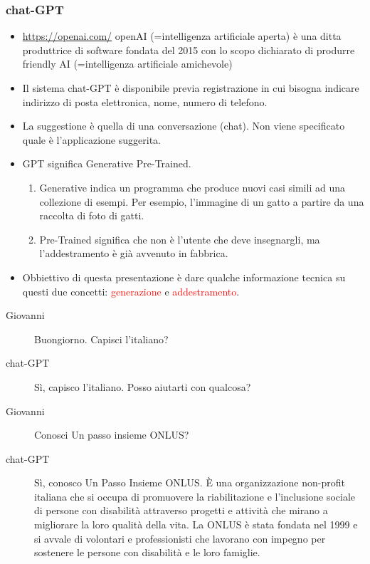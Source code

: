 \documentclass[xcolor=svgnames]{beamer}
\newcommand{\rosso}[1]{\textcolor{red}{#1}}
\renewcommand{\emph}{\rosso}
\begin{document}
\begin{frame}\small\frametitle{chat-GPT}

\begin{itemize}
\item \url{https://openai.com/} openAI (=intelligenza artificiale aperta) è una ditta produttrice di software fondata del 2015 con lo scopo dichiarato di produrre friendly 
AI (=intelligenza artificiale amichevole)
    \item Il sistema chat-GPT è disponibile previa registrazione in cui bisogna indicare indirizzo di posta elettronica, nome, numero di telefono.
    \item La suggestione è quella di una conversazione (chat). Non viene specificato quale è l'applicazione suggerita.
    \item GPT significa Generative Pre-Trained. 
    \begin{enumerate}
        \item Generative indica un programma che produce nuovi casi simili ad una collezione di esempi. Per esempio, l'immagine di un gatto a partire da una raccolta di foto di gatti.
        \item Pre-Trained significa che non è l'utente che deve insegnargli, ma l'addestramento è già avvenuto in fabbrica.
    \end{enumerate} 
    \item Obbiettivo di questa presentazione è dare qualche informazione tecnica su questi due concetti: \emph{generazione} e \emph{addestramento}.
\end{itemize}

\begin{description}

\item[Giovanni] Buongiorno. Capisci l'italiano?

\item[chat-GPT] Sì, capisco l'italiano. Posso aiutarti con qualcosa?

\item[Giovanni] Conosci Un passo insieme ONLUS?

\item[chat-GPT] Sì, conosco Un Passo Insieme ONLUS. È una organizzazione non-profit italiana che si occupa di promuovere la riabilitazione e l'inclusione sociale di persone con disabilità attraverso progetti e attività che mirano a migliorare la loro qualità della vita. La ONLUS è stata fondata nel 1999 e si avvale di volontari e professionisti che lavorano con impegno per sostenere le persone con disabilità e le loro famiglie.


\end{description}
\end{frame}
\end{document}
